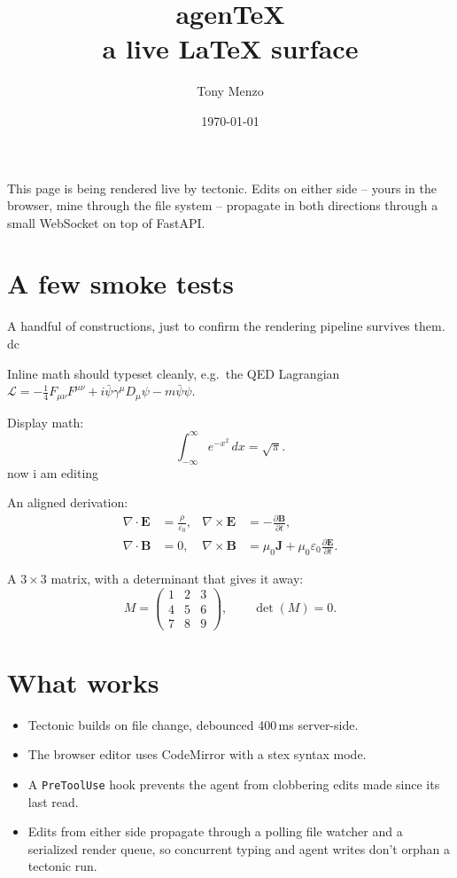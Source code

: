 \documentclass[11pt]{article}
\title{agen\TeX \\[0.1in] \large a live LaTeX surface}
\author{Tony Menzo}
\date{\today}
\begin{document}
\maketitle

\noindent
This page is being rendered live by tectonic. Edits on either side --
yours in the browser, mine through the file system -- propagate in both
directions through a small WebSocket on top of FastAPI.

\section*{A few smoke tests}

A handful of constructions, just to confirm the rendering pipeline survives them. dc

Inline math should typeset cleanly, e.g.\ the QED Lagrangian
$\mathcal{L} = -\tfrac{1}{4} F_{\mu\nu} F^{\mu\nu} + i\bar\psi\gamma^\mu D_\mu \psi - m\bar\psi\psi$.

Display math:
\[
  \int_{-\infty}^{\infty} e^{-x^2}\, dx = \sqrt{\pi}.
\]
now i am editing

An aligned derivation:
\begin{align*}
  \nabla \cdot \mathbf{E} &= \frac{\rho}{\varepsilon_0}, &
  \nabla \times \mathbf{E} &= -\frac{\partial \mathbf{B}}{\partial t}, \\
  \nabla \cdot \mathbf{B} &= 0, &
  \nabla \times \mathbf{B} &= \mu_0 \mathbf{J} + \mu_0 \varepsilon_0 \frac{\partial \mathbf{E}}{\partial t}.
\end{align*}


A $3\times 3$ matrix, with a determinant that gives it away:
\[
  M = \begin{pmatrix}
    1 & 2 & 3 \\
    4 & 5 & 6 \\
    7 & 8 & 9
  \end{pmatrix},
  \qquad
  \det(M) = 0.
\]
\section*{What works}

\begin{itemize}
  \item Tectonic builds on file change, debounced 400\,ms server-side.
  \item The browser editor uses CodeMirror with a stex syntax mode.
  \item A \texttt{PreToolUse} hook prevents the agent from clobbering
        edits made since its last read.
  \item Edits from either side propagate through a polling file watcher
        and a serialized render queue, so concurrent typing and agent
        writes don't orphan a tectonic run.
\end{itemize}
\end{document}
